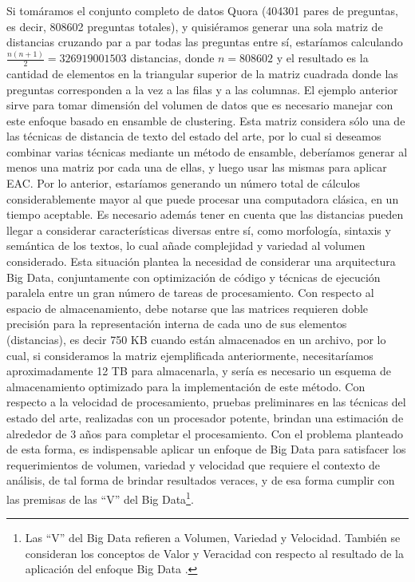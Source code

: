 \bigskip Si tomáramos el conjunto completo de datos Quora (404301 pares de preguntas, es decir, 808602 preguntas totales), y quisiéramos generar una sola matriz de distancias cruzando par a par todas las preguntas entre sí, estaríamos calculando $\frac{n(n+1)}{2} = 326919001503$ distancias, donde $n = 808602$ y el resultado es la cantidad de elementos en la triangular superior de la matriz cuadrada donde las preguntas corresponden a la vez a las filas y a las columnas. El ejemplo anterior sirve para tomar dimensión del volumen de datos que es necesario manejar con este enfoque basado en ensamble de clustering. Esta matriz considera sólo una de las técnicas de distancia de texto del estado del arte, por lo cual si deseamos combinar varias técnicas mediante un método de ensamble, deberíamos generar al menos una matriz por cada una de ellas, y luego usar las mismas para aplicar EAC. Por lo anterior, estaríamos generando un número total de cálculos considerablemente mayor al que puede procesar una computadora clásica, en un tiempo aceptable. Es necesario además tener en cuenta que las distancias pueden llegar a considerar características diversas entre sí, como morfología, sintaxis y semántica de los textos, lo cual añade complejidad y variedad al volumen considerado. Esta situación plantea la necesidad de considerar una arquitectura Big Data, conjuntamente con optimización de código y técnicas de ejecución paralela entre un gran número de tareas de procesamiento. Con respecto al espacio de almacenamiento, debe notarse que las matrices requieren doble precisión para la representación interna de cada uno de sus elementos (distancias), es decir 750 KB cuando están almacenados en un archivo, por lo cual, si consideramos la matriz ejemplificada anteriormente, necesitaríamos aproximadamente 12 TB para almacenarla, y sería es necesario un esquema de almacenamiento optimizado para la implementación de este método. Con respecto a la velocidad de procesamiento, pruebas preliminares en las técnicas del estado del arte, realizadas con un procesador potente, brindan una estimación de alrededor de 3 años para completar el procesamiento. Con el problema planteado de esta forma, es indispensable aplicar un enfoque de Big Data para satisfacer los requerimientos de volumen, variedad y velocidad que requiere el contexto de análisis, de tal forma de brindar resultados veraces, y de esa forma cumplir con las premisas de las “V” del Big Data\footnote{Las “V” del Big Data refieren a Volumen, Variedad y Velocidad. También se consideran los conceptos de Valor y Veracidad con respecto al resultado de la aplicación del enfoque Big Data \citep{gandomi2015beyond}.}.

